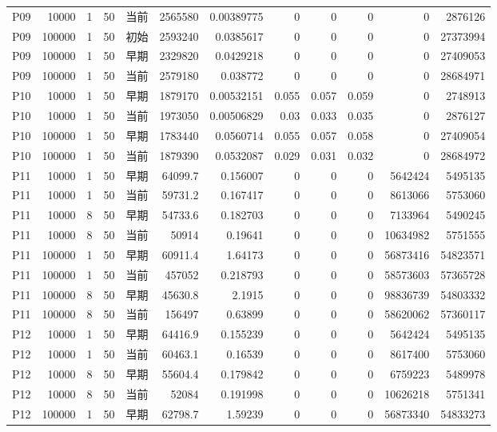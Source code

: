\documentclass[UTF8,a4paper,10pt,twocolumn,fontset=fandol]{ctexart}
\begin{document}
\begin{longtable}{@{}lrrrlrrrrrrr@{}}
P09 & 10000 & 1 & 50 & 当前 & 2565580 & 0.00389775 & 0 & 0 & 0 & 0 & 2876126 \\
P09 & 100000 & 1 & 50 & 初始 & 2593240 & 0.0385617 & 0 & 0 & 0 & 0 & 27373994 \\
P09 & 100000 & 1 & 50 & 早期 & 2329820 & 0.0429218 & 0 & 0 & 0 & 0 & 27409053 \\
P09 & 100000 & 1 & 50 & 当前 & 2579180 & 0.038772 & 0 & 0 & 0 & 0 & 28684971 \\
P10 & 10000 & 1 & 50 & 早期 & 1879170 & 0.00532151 & 0.055 & 0.057 & 0.059 & 0 & 2748913 \\
P10 & 10000 & 1 & 50 & 当前 & 1973050 & 0.00506829 & 0.03 & 0.033 & 0.035 & 0 & 2876127 \\
P10 & 100000 & 1 & 50 & 早期 & 1783440 & 0.0560714 & 0.055 & 0.057 & 0.058 & 0 & 27409054 \\
P10 & 100000 & 1 & 50 & 当前 & 1879390 & 0.0532087 & 0.029 & 0.031 & 0.032 & 0 & 28684972 \\
P11 & 10000 & 1 & 50 & 早期 & 64099.7 & 0.156007 & 0 & 0 & 0 & 5642424 & 5495135 \\
P11 & 10000 & 1 & 50 & 当前 & 59731.2 & 0.167417 & 0 & 0 & 0 & 8613066 & 5753060 \\
P11 & 10000 & 8 & 50 & 早期 & 54733.6 & 0.182703 & 0 & 0 & 0 & 7133964 & 5490245 \\
P11 & 10000 & 8 & 50 & 当前 & 50914 & 0.19641 & 0 & 0 & 0 & 10634982 & 5751555 \\
P11 & 100000 & 1 & 50 & 早期 & 60911.4 & 1.64173 & 0 & 0 & 0 & 56873416 & 54823571 \\
P11 & 100000 & 1 & 50 & 当前 & 457052 & 0.218793 & 0 & 0 & 0 & 58573603 & 57365728 \\
P11 & 100000 & 8 & 50 & 早期 & 45630.8 & 2.1915 & 0 & 0 & 0 & 98836739 & 54803332 \\
P11 & 100000 & 8 & 50 & 当前 & 156497 & 0.63899 & 0 & 0 & 0 & 58620062 & 57360117 \\
P12 & 10000 & 1 & 50 & 早期 & 64416.9 & 0.155239 & 0 & 0 & 0 & 5642424 & 5495135 \\
P12 & 10000 & 1 & 50 & 当前 & 60463.1 & 0.16539 & 0 & 0 & 0 & 8617400 & 5753060 \\
P12 & 10000 & 8 & 50 & 早期 & 55604.4 & 0.179842 & 0 & 0 & 0 & 6759223 & 5489978 \\
P12 & 10000 & 8 & 50 & 当前 & 52084 & 0.191998 & 0 & 0 & 0 & 10626218 & 5751341 \\
P12 & 100000 & 1 & 50 & 早期 & 62798.7 & 1.59239 & 0 & 0 & 0 & 56873340 & 54833273 \\

\end{longtable}
\end{document}
